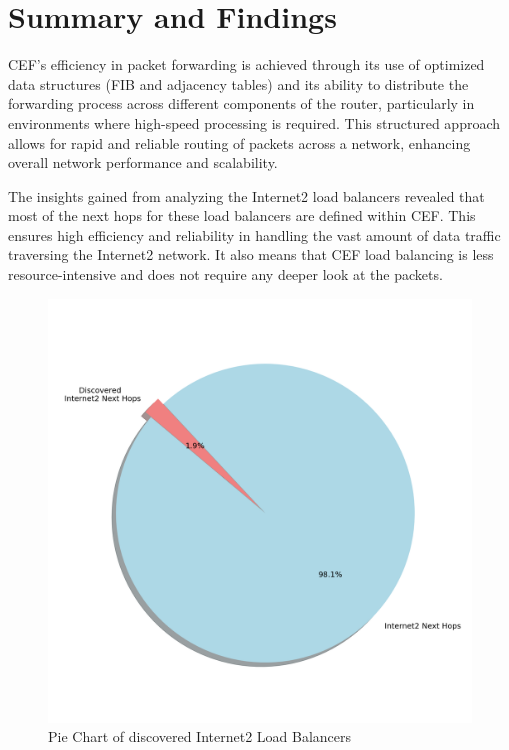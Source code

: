 \documentclass[12pt]{cwru_thesis}
\begin{document}
\section{Summary and Findings}

CEF's efficiency in packet forwarding is achieved through its use of optimized data structures (FIB and adjacency tables) and its ability to distribute the forwarding process across different components of the router, particularly in environments where high-speed processing is required. This structured approach allows for rapid and reliable routing of packets across a network, enhancing overall network performance and scalability.

The insights gained from analyzing the Internet2 load balancers revealed that most of the next hops for these load balancers are defined within CEF. This ensures high efficiency and reliability in handling the vast amount of data traffic traversing the Internet2 network. It also means that CEF load balancing is less resource-intensive and does not require any deeper look at the packets.





\begin{figure}[h!]
    \centering
    \includegraphics[width =\linewidth]{figures/internet2_next_hops_pie_chart.png}
    \caption{Pie Chart of discovered Internet2 Load Balancers}
    \label{fig:pie_chart_internet2}
\end{figure}
\end{document}
